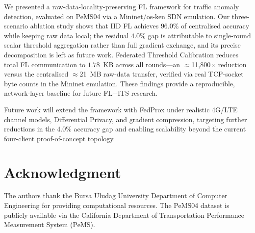 \documentclass[conference]{IEEEtran}
\begin{document}
We presented a raw-data-locality-preserving FL framework for traffic
anomaly detection, evaluated on PeMS04 via a Mininet/os-ken SDN
emulation.
Our three-scenario ablation study shows that IID FL achieves $96.0\%$
of centralised accuracy while keeping raw data local; the residual
$4.0\%$ gap is attributable to single-round scalar threshold aggregation
rather than full gradient exchange, and its precise decomposition is left
as future work.
Federated Threshold Calibration reduces total FL communication to
$1.78$~KB across all rounds---an $\approx$11,800$\times$ reduction versus
the centralised $\approx$21~MB raw-data transfer, verified via real
TCP-socket byte counts in the Mininet emulation.
These findings provide a reproducible, network-layer baseline for future
FL+ITS research.

Future work will extend the framework with FedProx under realistic
4G/LTE channel models, Differential Privacy, and gradient compression,
targeting further reductions in the $4.0\%$ accuracy gap and enabling
scalability beyond the current four-client proof-of-concept topology.

\section*{Acknowledgment}

The authors thank the Bursa Uludag University Department of Computer
Engineering for providing computational resources.
The PeMS04 dataset is publicly available via the California Department
of Transportation Performance Measurement System (PeMS).
\end{document}
